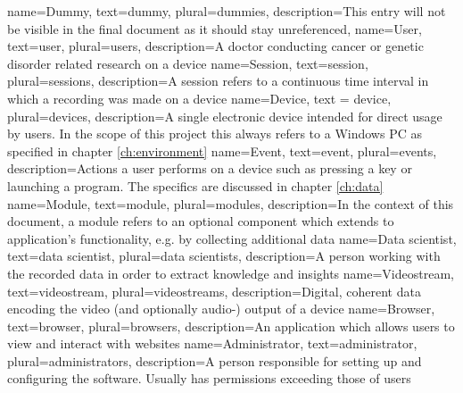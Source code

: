 \label{ch:glossary}

{
	name=Dummy, %
	text=dummy, %
	plural=dummies, %
	description={This entry will not be visible in the final document as it should stay unreferenced}, %
}
{
	name=User,
	text=user,
	plural=users,
	description={A doctor conducting cancer or genetic disorder related research on a \gls{device}}
}
{
	name=Session,
	text=session,
	plural=sessions,
	description={A session refers to a continuous time interval in which a recording was made on a \gls{device}}
}
{
	name=Device,
	text = device,
	plural=devices,
	description={A single electronic device intended for direct usage by \glspl{user}. In the scope of this project this always refers to a Windows PC as specified in chapter \ref{ch:environment}}
}
{
	name=Event,
	text=event,
	plural=events,
	description={Actions a user performs on a \gls{device} such as pressing a key or launching a program. The specifics are discussed in chapter \ref{ch:data}}
}
{
	name=Module,
	text=module,
	plural=modules,
	description={In the context of this document, a module refers to an optional component which extends to application's functionality, e.g. by collecting additional data}
}
{
	name=Data scientist,
	text=data scientist,
	plural=data scientists,
	description={A person working with the recorded data in order to extract knowledge and insights}
}
{
	name=Videostream,
	text=videostream,
	plural=videostreams,
	description={Digital, coherent data encoding the video (and optionally audio-) output of a \gls{device}}
}
{
	name=Browser,
	text=browser,
	plural=browsers,
	description={An application which allows \glspl{user} to view and interact with websites}
}
{
	name=Administrator,
	text=administrator,
	plural=administrators,
	description={A person responsible for setting up and configuring the software. Usually has permissions exceeding those of \glspl{user}}
}